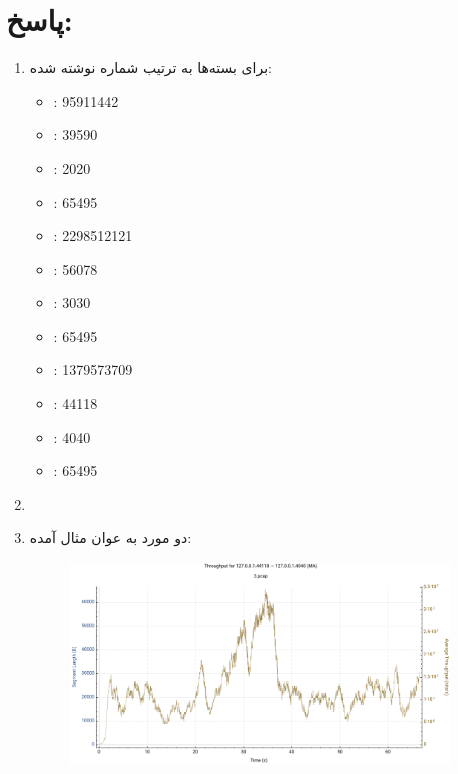\section*{پاسخ:}

\begin{enumerate}[label=\alph*)]


\item 
برای بسته‌ها به ترتیب شماره نوشته شده:

\begin{itemize}
    \item {}: 95911442
    \item {}: 39590
    \item {}: 2020
    \item {}: 65495
\end{itemize}

\begin{itemize}
    \item {}: 2298512121
    \item {}: 56078
    \item {}: 3030
    \item {}: 65495
\end{itemize}


\begin{itemize}
    \item {}: 1379573709
    \item {}: 44118
    \item {}: 4040
    \item {}: 65495
\end{itemize}


\item 

\item دو مورد به عوان مثال آمده:


\begin{figure}[H]
    \centering
    \includegraphics[width=0.95\textwidth]{Solutions/pics/PQ1_sol_1.png}
    \caption{}
    \label{fig:small-example}
\end{figure}



\end{enumerate}
